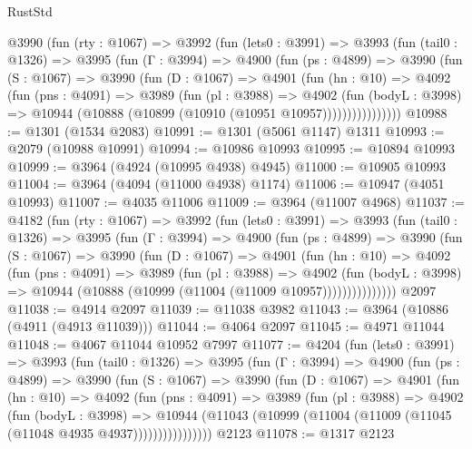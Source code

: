 \begin{lexlean}{RustStd}
\begin{coremodule}
    @3990
      (fun (rty : @1067) =>
      @3992
        (fun (lets0 : @3991) =>
        @3993
          (fun (tail0 : @1326) =>
          @3995
            (fun (Γ : @3994) =>
            @4900
              (fun (ps : @4899) =>
              @3990
                (fun (S : @1067) =>
                @3990
                  (fun (D : @1067) =>
                  @4901
                    (fun (hn : @10) =>
                    @4092
                      (fun (pns : @4091) =>
                      @3989
                        (fun (pl : @3988) =>
                        @4902
                          (fun (bodyL : @3998) =>
                          @10944 (@10888 (@10899 (@10910 (@10951 @10957))))))))))))))))
@10988 := @1301 (@1534 @2083)
@10991 := @1301 (@5061 @1147) @1311
@10993 := @2079 (@10988 @10991)
@10994 := @10986 @10993
@10995 := @10894 @10993
@10999 := @3964 (@4924 (@10995 @4938) @4945)
@11000 := @10905 @10993
@11004 := @3964 (@4094 (@11000 @4938) @1174)
@11006 := @10947 (@4051 @10993)
@11007 := @4035 @11006
@11009 := @3964 (@11007 @4968)
@11037 := @4182
    (fun (rty : @1067) =>
    @3992
      (fun (lets0 : @3991) =>
      @3993
        (fun (tail0 : @1326) =>
        @3995
          (fun (Γ : @3994) =>
          @4900
            (fun (ps : @4899) =>
            @3990
              (fun (S : @1067) =>
              @3990
                (fun (D : @1067) =>
                @4901
                  (fun (hn : @10) =>
                  @4092
                    (fun (pns : @4091) =>
                    @3989
                      (fun (pl : @3988) =>
                      @4902
                        (fun (bodyL : @3998) =>
                        @10944 (@10888 (@10999 (@11004 (@11009 @10957)))))))))))))))
    @2097
@11038 := @4914 @2097
@11039 := @11038 @3982
@11043 := @3964 (@10886 (@4911 (@4913 @11039)))
@11044 := @4064 @2097
@11045 := @4971 @11044
@11048 := @4067 @11044 @10952 @7997
@11077 := @4204
    (fun (lets0 : @3991) =>
    @3993
      (fun (tail0 : @1326) =>
      @3995
        (fun (Γ : @3994) =>
        @4900
          (fun (ps : @4899) =>
          @3990
            (fun (S : @1067) =>
            @3990
              (fun (D : @1067) =>
              @4901
                (fun (hn : @10) =>
                @4092
                  (fun (pns : @4091) =>
                  @3989
                    (fun (pl : @3988) =>
                    @4902
                      (fun (bodyL : @3998) =>
                      @10944
                        (@11043 (@10999 (@11004 (@11009 (@11045 (@11048 @4935 @4937))))))))))))))))
    @2123
@11078 := @1317 @2123

\end{coremodule}
\end{lexlean}
